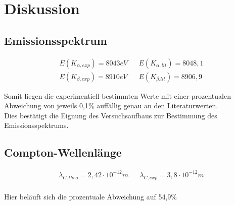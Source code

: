 \section{Diskussion}
\label{sec:Diskussion}

\subsection{Emissionsspektrum}
\label{subsec:disk_emission}

\begin{align*}
    E(K_{\alpha,exp}) = 8043 eV &&  E(K_{\alpha,lit}) = 8048,1 \\
    E(K_{\beta,exp}) = 8910 eV  &&  E(K_{\beta.lit}) = 8906,9
\end{align*}

Somit liegen die experimentiell bestimmten Werte mit einer prozentualen Abweichung von jeweils 0,1\% auffällig
genau an den Literaturwerten. \\
Dies bestätigt die Eignung des Versuchsaufbaus zur Bestimmung des Emissionsspektrums.\\






\subsection{Compton-Wellenlänge}
\label{subsec:disk_compton}

\begin{align*}
    \lambda_{C, theo} = 2,42 \cdot 10^{-12}m && \lambda_{C, exp} = 3,8 \cdot 10^{-12}m \\
\end{align*}

Hier beläuft sich die prozentuale Abweichung auf 54,9\%